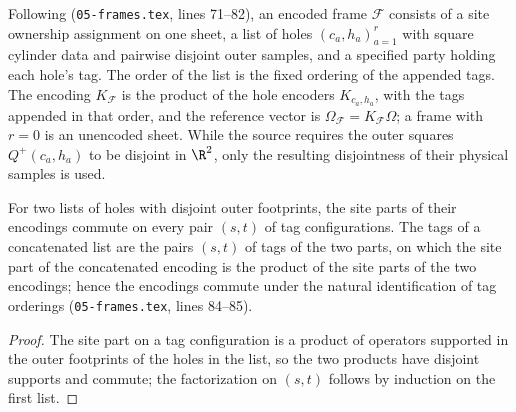 \begin{definition}
    \label{def:peps_frame}
    \leanok
    Following \cite[Definition~6.1]{OpenAI2026PolynomialPEPS}
    (\texttt{05-frames.tex}, lines 71--82), an encoded frame $\mathcal F$ consists of a site ownership assignment on
    one sheet, a list of holes $(c_a,h_a)_{a=1}^r$ with square cylinder data and pairwise
    disjoint outer samples, and a specified party holding each hole's tag.
    The order of the list is the fixed ordering of the appended tags. The
    encoding $K_{\mathcal F}$ is the product of the hole encoders $K_{c_a,h_a}$, with the
    tags appended in that order, and the reference vector is
    $\Omega_{\mathcal F}=K_{\mathcal F}\Omega$; a frame with $r=0$ is an unencoded
    sheet. While the source requires the outer
    squares $Q^+(c_a,h_a)$ to be disjoint in $\R^2$, only the resulting disjointness of their
    physical samples is used.
\end{definition}

\begin{lemma}
    \label{lem:peps_frame_commute}
    \leanok
    For two lists of holes with disjoint outer footprints, the site parts of
    their encodings commute on every pair $(s,t)$ of tag configurations. The tags of
    a concatenated list are the pairs $(s,t)$ of tags of the two parts, on which the site part of the concatenated encoding is the product of
    the site parts of the two encodings; hence the encodings commute under
    the natural identification of tag orderings
    (\texttt{05-frames.tex}, lines 84--85).
\end{lemma}

\begin{proof}\leanok
    The site part on a tag configuration is a product of operators supported
    in the outer footprints of the holes in the list, so the two products
    have disjoint supports and commute; the factorization on $(s,t)$ follows by
    induction on the first list.
\end{proof}

